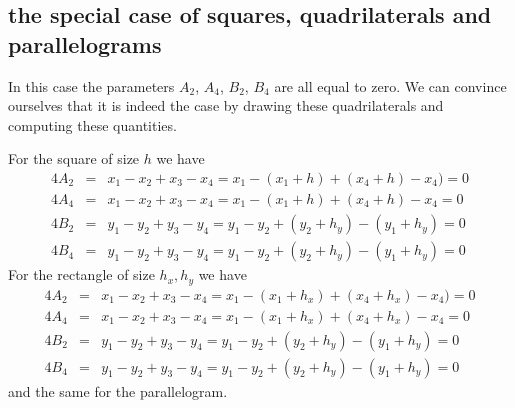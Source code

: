 \subsection{the special case of squares, quadrilaterals and parallelograms}

In this case the parameters $A_2$, $A_4$, $B_2$, $B_4$ are all equal to zero.
We can convince ourselves that it is indeed the case
by drawing these quadrilaterals and computing 
these quantities.

\begin{center}
\end{center}

For the square of size $h$ we have 
\begin{eqnarray}
4A_2 &=& x_1 -x_2 +x_3 -x_4 = x_1 -(x_1+h) +(x_4+h) -x_4) =0 \nonumber\\
4A_4 &=& x_1 -x_2 +x_3 -x_4 = x_1 -(x_1+h) +(x_4+h) -x_4  =0 \nonumber\\
4B_2 &=& y_1 -y_2 +y_3 -y_4 = y_1 -y_2 + (y_2+h_y) -(y_1+h_y) = 0 \nonumber\\
4B_4 &=& y_1 -y_2 +y_3 -y_4 = y_1 -y_2 + (y_2+h_y) -(y_1+h_y) = 0 \nonumber
\end{eqnarray}
For the rectangle of size $h_x,h_y$ we have 
\begin{eqnarray}
4A_2 &=& x_1 -x_2 +x_3 -x_4 = x_1 -(x_1+h_x) +(x_4+h_x) -x_4) =0 \nonumber\\
4A_4 &=& x_1 -x_2 +x_3 -x_4 = x_1 -(x_1+h_x) +(x_4+h_x) -x_4  =0 \nonumber\\
4B_2 &=& y_1 -y_2 +y_3 -y_4 = y_1 -y_2 + (y_2+h_y) -(y_1+h_y) = 0 \nonumber\\
4B_4 &=& y_1 -y_2 +y_3 -y_4 = y_1 -y_2 + (y_2+h_y) -(y_1+h_y) = 0 \nonumber
\end{eqnarray}
and the same for the parallelogram.





